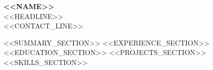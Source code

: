 \documentclass[11pt,a4paper]{article}
\begin{document}
\begin{center}
    {\LARGE \textbf{<<NAME>>}}\\
    \vspace{0.2em}
    <<HEADLINE>>\\
    \vspace{0.2em}
    <<CONTACT_LINE>>
\end{center}

<<SUMMARY_SECTION>>
<<EXPERIENCE_SECTION>>
<<EDUCATION_SECTION>>
<<PROJECTS_SECTION>>
<<SKILLS_SECTION>>
\end{document}
